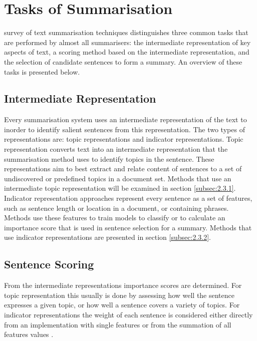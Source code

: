 \section{Tasks of Summarisation}
\label{sec:2.2}

\citet{nenkova2012survey} survey of text summarisation techniques distinguishes three common tasks that are performed by almost all summarisers: the intermediate representation of key aspects of text, a scoring method based on the intermediate representation, and the selection of candidate sentences to form a summary. An overview of these tasks is presented below.

\subsection{Intermediate Representation}
\label{subsec:2.2.1}

Every summarisation system uses an intermediate representation of the text to inorder to identify salient sentences from this representation. The two types of representations are: topic representations and indicator representations. Topic representation converts text into an intermediate representation that the summarisation method uses to identify topics in the sentence. These representations aim to best extract and relate content of sentences to a set of undiscovered or predefined topics in a document set. Methods that use an intermediate topic representation will be examined in section \ref{subsec:2.3.1}. Indicator representation approaches represent every sentence as a set of features, such as sentence length or location in a document, or containing phrases. Methods use these features to train models to classify or to calculate an importance score that is used in sentence selection for a summary. Methods that use indicator representations are presented in section \ref{subsec:2.3.2}.

\subsection{Sentence Scoring}
\label{subsec:2.2.2}

From the intermediate representations importance scores are determined. For topic representation this usually is done by assessing how well the sentence expresses a given topic, or how well a sentence covers a variety of topics. For indicator representations the weight of each sentence is considered either directly from an implementation with single features \citep{erkan2004lexrank} or from the summation of all features values \citep{fattah2014hybrid}.

